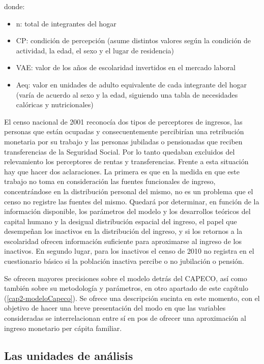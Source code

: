 donde:
\begin{itemize}
	\item n: total de integrantes del hogar
	\item CP: condición de percepción (asume distintos valores según la condición de actividad, la edad, el sexo y el lugar de residencia)
	\item VAE: valor de los años de escolaridad invertidos en el mercado laboral
	\item Aeq: valor en unidades de adulto equivalente de cada integrante del hogar (varía de acuerdo al sexo y la edad, siguiendo una tabla de necesidades calóricas y nutricionales)
\end{itemize}


El censo nacional de 2001 reconocía dos tipos de perceptores de ingresos, las personas que están ocupadas y consecuentemente percibirían una retribución monetaria por su trabajo y las personas jubiladas o pensionadas que reciben transferencias de la Seguridad Social. Por lo tanto quedaban excluidos del relevamiento los perceptores de rentas y transferencias. Frente a esta situación hay que hacer dos aclaraciones. La primera es que en la medida en que este trabajo no toma en consideración las fuentes funcionales de ingreso, concentrándose en la distribución personal del mismo, no es un problema que el censo no registre las fuentes del mismo. Quedará por determinar, en función de la información disponible, los parámetros del modelo y los desarrollos teóricos del capital humano y la desigual distribución espacial del ingreso, el papel que desempeñan los inactivos en la distribución del ingreso, y si los retornos a la escolaridad ofrecen información suficiente para aproximarse al ingreso de los inactivos. En segundo lugar, para los inactivos el censo de 2010 no registra en el cuestionario básico si la población inactiva percibe o no jubilación o pensión.

Se ofrecen mayores precisiones sobre el modelo detrás del CAPECO, así como también sobre su metodología y parámetros, en otro apartado de este capítulo (\ref{cap2-modeloCapeco}). Se ofrece una descripción sucinta en este momento, con el objetivo de hacer una breve presentación del modo en que las variables consideradas se interrelacionan entre sí en pos de ofrecer una aproximación al ingreso monetario per cápita familiar. 

	
	\subsection{Las unidades de análisis}
	
